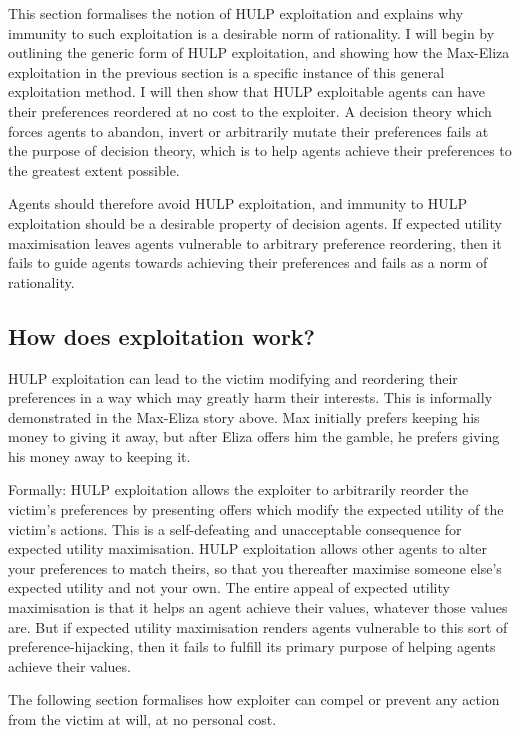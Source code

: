 \documentclass{article}
\begin{document}
This section formalises the notion of HULP exploitation and explains why immunity to such exploitation is a desirable norm of rationality. I will begin by outlining the generic form of HULP exploitation, and showing how the Max-Eliza exploitation in the previous section is a specific instance of this general exploitation method. I will then show that HULP exploitable agents can have their preferences reordered at no cost to the exploiter. A decision theory which forces agents to abandon, invert or arbitrarily mutate their preferences fails at the purpose of decision theory, which is to help agents achieve their preferences to the greatest extent possible. 

Agents should therefore avoid HULP exploitation, and immunity to HULP exploitation should be a desirable property of decision agents. If expected utility maximisation leaves agents vulnerable to arbitrary preference reordering, then it fails to guide agents towards achieving their preferences and fails as a norm of rationality. 

\subsection{How does exploitation work?}

HULP exploitation can lead to the victim modifying and reordering their preferences in a way which may greatly harm their interests. This is informally demonstrated in the Max-Eliza story above. Max initially prefers keeping his money to giving it away, but after Eliza offers him the gamble, he prefers giving his money away to keeping it.

Formally: HULP exploitation allows the exploiter to arbitrarily reorder the victim's preferences by presenting offers which modify the expected utility of the victim's actions. This is a self-defeating and unacceptable consequence for expected utility maximisation. HULP exploitation allows other agents to alter your preferences to match theirs, so that you thereafter maximise someone else's expected utility and not your own. The entire appeal of expected utility maximisation is that it helps an agent achieve their values, whatever those values are. But if expected utility maximisation renders agents vulnerable to this sort of preference-hijacking, then it fails to fulfill its primary purpose of helping agents achieve their values.

The following section formalises how exploiter can compel or prevent any action from the victim at will, at no personal cost. 
\end{document}
